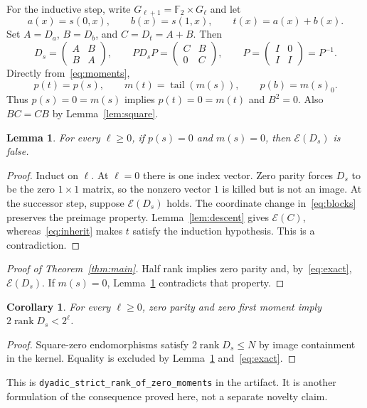 \documentclass[11pt]{article}
\newtheorem{lemma}[theorem]{Lemma}
\newtheorem{corollary}[theorem]{Corollary}
\theoremstyle{definition}
\newcommand{\F}{\mathbb F_2}
\newcommand{\rk}{\operatorname{rank}}
\newcommand{\E}{\mathcal E}
\begin{document}
For the inductive step, write $G_{\ell+1}=\F\times G_\ell$ and let
\[
 a(x)=s(0,x),\qquad b(x)=s(1,x),\qquad t(x)=a(x)+b(x).
\]
Set $A=D_a$, $B=D_b$, and $C=D_t=A+B$. Then
\begin{equation}\label{eq:blocks}
 D_s=\begin{pmatrix}A&B\\B&A\end{pmatrix},\qquad
 P D_s P=\begin{pmatrix}C&B\\0&C\end{pmatrix},\qquad
 P=\begin{pmatrix}I&0\\I&I\end{pmatrix}=P^{-1}.
\end{equation}
Directly from~\eqref{eq:moments},
\begin{equation}\label{eq:inherit}
 p(t)=p(s),\qquad m(t)=\operatorname{tail}(m(s)),\qquad
 p(b)=m(s)_0.
\end{equation}
Thus $p(s)=0=m(s)$ implies $p(t)=0=m(t)$ and $B^2=0$. Also $BC=CB$ by Lemma~\ref{lem:square}.

\begin{lemma}\label{lem:nonexact}
For every $\ell\ge0$, if $p(s)=0$ and $m(s)=0$, then $\E(D_s)$ is false.
\end{lemma}
\begin{proof}
Induct on $\ell$. At $\ell=0$ there is one index vector. Zero parity forces $D_s$ to be the zero $1\times1$ matrix, so the nonzero vector $1$ is killed but is not an image. At the successor step, suppose $\E(D_s)$ holds. The coordinate change in~\eqref{eq:blocks} preserves the preimage property. Lemma~\ref{lem:descent} gives $\E(C)$, whereas~\eqref{eq:inherit} makes $t$ satisfy the induction hypothesis. This is a contradiction.
\end{proof}

\begin{proof}[Proof of Theorem~\ref{thm:main}]
Half rank implies zero parity and, by~\eqref{eq:exact}, $\E(D_s)$. If $m(s)=0$, Lemma~\ref{lem:nonexact} contradicts that property.
\end{proof}

\begin{corollary}\label{cor:deficit}
For every $\ell\ge0$, zero parity and zero first moment imply $2\rk D_s<2^\ell$.
\end{corollary}
\begin{proof}
Square-zero endomorphisms satisfy $2\rk D_s\le N$ by image containment in the kernel. Equality is excluded by Lemma~\ref{lem:nonexact} and~\eqref{eq:exact}.
\end{proof}
This is \texttt{dyadic\_strict\_rank\_of\_zero\_moments} in the artifact. It is another formulation of the consequence proved here, not a separate novelty claim.
\end{document}

